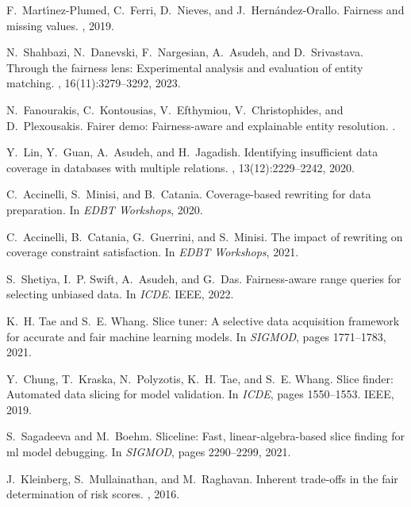 \documentclass[11pt]{article}
\begin{document}
\begin{thebibliography}{10}
F.~Mart{\'\i}nez-Plumed, C.~Ferri, D.~Nieves, and J.~Hern{\'a}ndez-Orallo.
\newblock Fairness and missing values.
, 2019.

N.~Shahbazi, N.~Danevski, F.~Nargesian, A.~Asudeh, and D.~Srivastava.
\newblock Through the fairness lens: Experimental analysis and evaluation of entity matching.
, 16(11):3279--3292, 2023.

N.~Fanourakis, C.~Kontousias, V.~Efthymiou, V.~Christophides, and D.~Plexousakis.
\newblock Fairer demo: Fairness-aware and explainable entity resolution.
.

Y.~Lin, Y.~Guan, A.~Asudeh, and H.~Jagadish.
\newblock Identifying insufficient data coverage in databases with multiple relations.
, 13(12):2229--2242, 2020.

C.~Accinelli, S.~Minisi, and B.~Catania.
\newblock Coverage-based rewriting for data preparation.
\newblock In {\em EDBT Workshops}, 2020.

C.~Accinelli, B.~Catania, G.~Guerrini, and S.~Minisi.
\newblock The impact of rewriting on coverage constraint satisfaction.
\newblock In {\em EDBT Workshops}, 2021.

S.~Shetiya, I.~P. Swift, A.~Asudeh, and G.~Das.
\newblock Fairness-aware range queries for selecting unbiased data.
\newblock In {\em ICDE}. IEEE, 2022.

K.~H. Tae and S.~E. Whang.
\newblock Slice tuner: A selective data acquisition framework for accurate and fair machine learning models.
\newblock In {\em SIGMOD}, pages 1771--1783, 2021.

Y.~Chung, T.~Kraska, N.~Polyzotis, K.~H. Tae, and S.~E. Whang.
\newblock Slice finder: Automated data slicing for model validation.
\newblock In {\em ICDE}, pages 1550--1553. IEEE, 2019.

S.~Sagadeeva and M.~Boehm.
\newblock Sliceline: Fast, linear-algebra-based slice finding for ml model debugging.
\newblock In {\em SIGMOD}, pages 2290--2299, 2021.

J.~Kleinberg, S.~Mullainathan, and M.~Raghavan.
\newblock Inherent trade-offs in the fair determination of risk scores.
, 2016.


\end{thebibliography}
\end{document}
